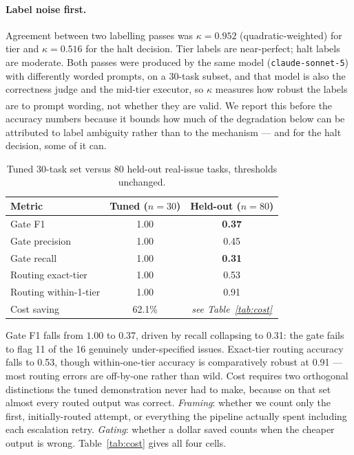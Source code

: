 \documentclass[sigconf,review,anonymous]{acmart}
\newcommand{\corr}{\textsuperscript{\dag}}
\begin{document}
\paragraph{Label noise first.} Agreement between two labelling passes was
$\kappa = 0.952$ (quadratic-weighted) for tier and $\kappa = 0.516$ for the halt
decision. Tier labels are near-perfect; halt labels are moderate. Both passes were produced by
the same model (\texttt{claude-sonnet-5}) with differently worded prompts, on a 30-task subset,
and that model is also the correctness judge and the mid-tier executor, so $\kappa$ measures how
robust the labels are to prompt wording, not whether they are valid\corr{}. We report this before the
accuracy numbers because it bounds how much of the degradation below can be attributed to
label ambiguity rather than to the mechanism --- and for the halt decision, some of it can.

\begin{table}[t]
\caption{Tuned 30-task set versus 80 held-out real-issue tasks, thresholds unchanged.}
\label{tab:eval2}
\small
\begin{tabular}{lcc}
\toprule
Metric & Tuned ($n{=}30$) & Held-out ($n{=}80$) \\
\midrule
Gate F1 & 1.00 & \textbf{0.37} \\
Gate precision & 1.00 & 0.45 \\
Gate recall & 1.00 & \textbf{0.31} \\
Routing exact-tier & 1.00 & 0.53 \\
Routing within-1-tier & 1.00 & 0.91 \\
Cost saving & 62.1\% & \emph{see Table~\ref{tab:cost}} \\
\bottomrule
\end{tabular}
\end{table}

Gate F1 falls from $1.00$ to 0.37, driven by recall collapsing to 0.31: the gate fails
to flag 11 of the 16 genuinely under-specified issues. Exact-tier routing accuracy falls to
0.53, though within-one-tier accuracy is comparatively robust at 0.91 --- most routing
errors are off-by-one rather than wild. Cost requires two orthogonal distinctions the tuned demonstration never had to make, because on that set
almost every routed output was correct. \emph{Framing}: whether we count only the first, initially-routed
attempt, or everything the pipeline actually spent including each escalation retry. \emph{Gating}: whether
a dollar saved counts when the cheaper output is wrong. Table~\ref{tab:cost} gives all four cells.
\end{document}
